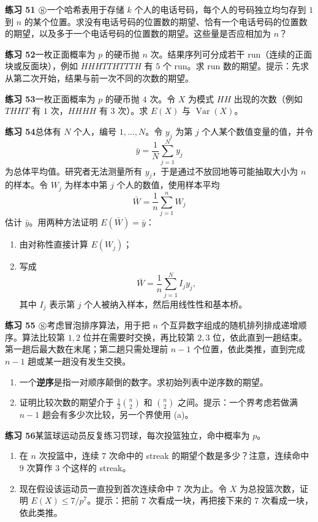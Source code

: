 \documentclass[UTF8,12pt,a4paper,fontset=fandol]{ctexart}
\begin{document}
\noindent\textbf{练习 51 $\circledS$}\quad 一个哈希表用于存储 $k$ 个人的电话号码，每个人的号码独立均匀存到 $1$ 到 $n$ 的某个位置。求没有电话号码的位置数的期望、恰有一个电话号码的位置数的期望，以及多于一个电话号码的位置数的期望。这些量是否应相加为 $n$？

\noindent\textbf{练习 52}\quad 一枚正面概率为 $p$ 的硬币抛 $n$ 次。结果序列可分成若干 run（连续的正面块或反面块），例如 $HHHTTHTTTH$ 有 $5$ 个 run。求 run 数的期望。提示：先求从第二次开始，结果与前一次不同的次数的期望。

\noindent\textbf{练习 53}\quad 一枚正面概率为 $p$ 的硬币抛 $4$ 次。令 $X$ 为模式 $HH$ 出现的次数（例如 $THHT$ 有 $1$ 次，$HHHH$ 有 $3$ 次）。求 $E(X)$ 与 $\operatorname{Var}(X)$。

\noindent\textbf{练习 54}\quad 总体有 $N$ 个人，编号 $1,\ldots,N$。令 $y_j$ 为第 $j$ 个人某个数值变量的值，并令
\[
  \bar{y}=\frac{1}{N}\sum_{j=1}^N y_j
\]
为总体平均值。研究者无法测量所有 $y_j$，于是通过不放回地等可能抽取大小为 $n$ 的样本。令 $W_j$ 为样本中第 $j$ 个人的数值，使用样本平均
\[
  \bar{W}=\frac{1}{n}\sum_{j=1}^n W_j
\]
估计 $\bar{y}$。用两种方法证明 $E(\bar{W})=\bar{y}$：
\begin{enumerate}
  \item[(a)] 由对称性直接计算 $E(W_j)$；
  \item[(b)] 写成
  \[
    \bar{W}=\frac{1}{n}\sum_{j=1}^N I_jy_j,
  \]
  其中 $I_j$ 表示第 $j$ 个人被纳入样本，然后用线性性和基本桥。
\end{enumerate}

\noindent\textbf{练习 55 $\circledS$}\quad 考虑冒泡排序算法，用于把 $n$ 个互异数字组成的随机排列排成递增顺序。算法比较第 $1,2$ 位并在需要时交换，再比较第 $2,3$ 位，依此直到一趟结束。第一趟后最大数在末尾；第二趟只需处理前 $n-1$ 个位置，依此类推，直到完成 $n-1$ 趟或某一趟没有发生交换。
\begin{enumerate}
  \item[(a)] 一个\textbf{逆序}是指一对顺序颠倒的数字。求初始列表中逆序数的期望。
  \item[(b)] 证明比较次数的期望介于 $\frac12\binom{n}{2}$ 和 $\binom{n}{2}$ 之间。提示：一个界考虑若做满 $n-1$ 趟会有多少次比较，另一个界使用 (a)。
\end{enumerate}

\noindent\textbf{练习 56}\quad 某篮球运动员反复练习罚球，每次投篮独立，命中概率为 $p$。
\begin{enumerate}
  \item[(a)] 在 $n$ 次投篮中，连续 $7$ 次命中的 streak 的期望个数是多少？注意，连续命中 $9$ 次算作 $3$ 个这样的 streak。
  \item[(b)] 现在假设该运动员一直投到首次连续命中 $7$ 次为止。令 $X$ 为总投篮次数，证明 $E(X)\le 7/p^7$。提示：把前 $7$ 次看成一块，再把接下来的 $7$ 次看成一块，依此类推。
\end{enumerate}
\end{document}
